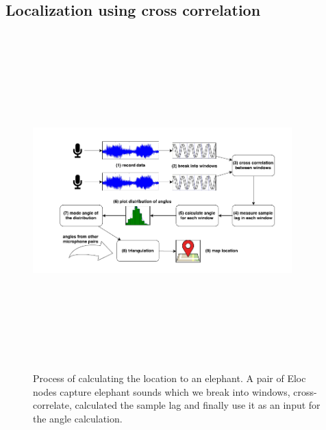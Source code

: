 \documentclass[12pt]{article}
\numberwithin{figure}{section}
\numberwithin{table}{section}
\begin{document}
\subsection{Localization using cross correlation}
\begin{figure}[H]
\centering
\includegraphics[width=10cm,height=13cm,keepaspectratio]{crosscor_implementation.png}
\caption{Process of calculating the location to an elephant.
A pair of Eloc nodes capture elephant sounds which we
break into windows, cross-correlate, calculated the sample
lag and finally use it as an input for the angle calculation.}
\label{d:p7}
\end{figure}
\end{document}
